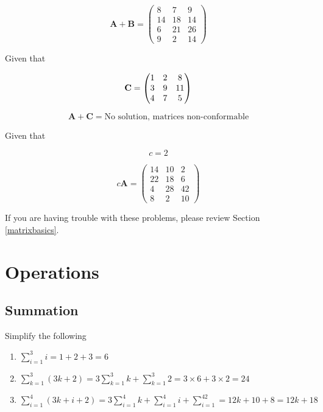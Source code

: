 \documentclass[
]{book}
\theoremstyle{definition}
\theoremstyle{definition}
\theoremstyle{definition}
\theoremstyle{definition}
\theoremstyle{remark}
\begin{document}
\[\mathbf{A} + \mathbf{B} = \begin{pmatrix}
            8 & 7 & 9 \\
            14 & 18 & 14 \\ 
            6 & 21 & 26 \\ 
            9 & 2 & 14
        \end{pmatrix}\]

Given that

\[{\bf C}=\begin{pmatrix}
            1 & 2 & 8 \\
            3 & 9 & 11 \\ 
            4 & 7 & 5 \\ 
        \end{pmatrix}\]

\[\mathbf{A} + \mathbf{C} = \text{No solution, matrices non-conformable}\]

Given that

\[c = 2\]

\[c\textbf{A} = \begin{pmatrix}
            14 & 10 & 2 \\
            22 & 18 & 6 \\ 
            4 & 28 & 42 \\ 
            8 & 2 & 10
        \end{pmatrix}\]

If you are having trouble with these problems, please review Section \ref{matrixbasics}.

\hypertarget{operations-1}{%
\section*{Operations}\label{operations-1}}

\hypertarget{summation-1}{%
\subsection*{Summation}\label{summation-1}}

Simplify the following

\begin{enumerate}
\def\labelenumi{\arabic{enumi}.}
\item
  \(\sum\limits_{i = 1}^3 i = 1 + 2+ 3 = 6\)
\item
  \(\sum\limits_{k = 1}^3(3k + 2) = 3\sum\limits_{k=1}^3k + \sum\limits_{k=1}^3 2= 3\times 6 + 3\times 2 = 24\)
\item
  \(\sum\limits_{i= 1}^4 (3k + i + 2) = 3\sum\limits_{i= 1}^4k + \sum\limits_{i= 1}^4i + \sum\limits_{i= 1}^42 = 12k + 10 + 8 = 12k + 18\)
\end{enumerate}
\end{document}
